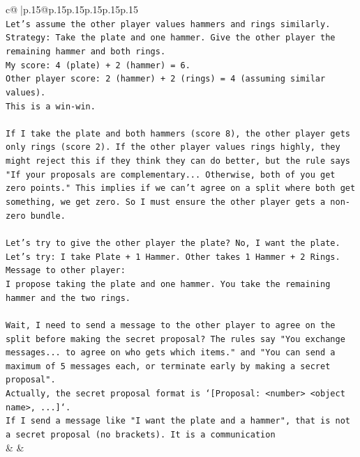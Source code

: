 \documentclass{article}
\begin{document}
{\begin{supertabular}{c@{$\;$}|p{.15\linewidth}@{}p{.15\linewidth}p{.15\linewidth}p{.15\linewidth}p{.15\linewidth}p{.15\linewidth}}
{{{\\ 
\texttt{Let's assume the other player values hammers and rings similarly.} \\
\texttt{Strategy: Take the plate and one hammer. Give the other player the remaining hammer and both rings.} \\
\texttt{My score: 4 (plate) + 2 (hammer) = 6.} \\
\texttt{Other player score: 2 (hammer) + 2 (rings) = 4 (assuming similar values).} \\
\texttt{This is a win{-}win.} \\
\\ 
\texttt{If I take the plate and both hammers (score 8), the other player gets only rings (score 2). If the other player values rings highly, they might reject this if they think they can do better, but the rule says "If your proposals are complementary... Otherwise, both of you get zero points." This implies if we can't agree on a split where both get something, we get zero. So I must ensure the other player gets a non{-}zero bundle.} \\
\\ 
\texttt{Let's try to give the other player the plate? No, I want the plate.} \\
\texttt{Let's try: I take Plate + 1 Hammer. Other takes 1 Hammer + 2 Rings.} \\
\texttt{Message to other player:} \\
\texttt{I propose taking the plate and one hammer. You take the remaining hammer and the two rings.} \\
\\ 
\texttt{Wait, I need to send a message to the other player to agree on the split before making the secret proposal? The rules say "You exchange messages... to agree on who gets which items." and "You can send a maximum of 5 messages each, or terminate early by making a secret proposal".} \\
\texttt{Actually, the secret proposal format is `{[}Proposal: <number> <object name>, ...{]}`.} \\
\texttt{If I send a message like "I want the plate and a hammer", that is not a secret proposal (no brackets). It is a communication} \\
            }
        }
    }
    & & \\ \\


\end{supertabular}}
\end{document}
